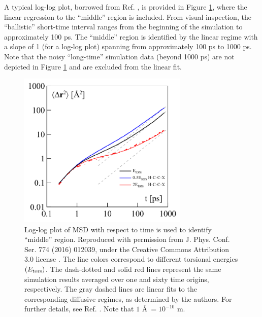 \documentclass[9pt,bestpractices]{livecoms}
\begin{document}
A typical log-log plot, borrowed from Ref. \cite{Kondratyuk2016}, is provided in Figure \ref{fig:KondratyukFig2}, where the linear regression to the ``middle'' region is included. From visual inspection, the ``ballistic'' short-time interval ranges from the beginning of the simulation to approximately 100 ps. The ``middle'' region is identified by the linear regime with a slope of 1 (for a log-log plot) spanning from approximately 100 ps to 1000 ps. Note that the noisy ``long-time'' simulation data (beyond 1000 ps) are not depicted in Figure \ref{fig:KondratyukFig2} and are excluded from the linear fit.


\begin{figure}[htb!]
	\centering
	\includegraphics[width=3.2in]{KondratyukFig2.png}
	\caption{Log-log plot of MSD with respect to time is used to identify ``middle'' region. Reproduced with permission from J. Phys. Conf. Ser. 774 (2016) 012039, under the Creative Commons Attribution 3.0 license \cite{Kondratyuk2016}. The line colors correspond to different torsional energies $(E_{\rm tors})$. The dash-dotted and solid red lines represent the same simulation results averaged over one and sixty time origins, respectively. The gray dashed lines are linear fits to the corresponding diffusive regimes, as determined by the authors. For further details, see Ref. \cite{Kondratyuk2016}. Note that $1$ \AA $\ = 10^{-10}$ m.}%
	\label{fig:KondratyukFig2}
\end{figure}
\end{document}
